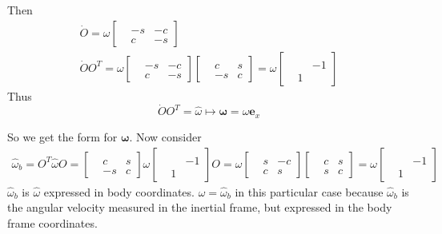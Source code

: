 \documentclass[10pt]{amsart}
\begin{document}
\begin{multicols*}{2}
Then
\[
\begin{gathered}
	\dot{O} = \omega \left[ \begin{matrix} & & \\ & -s & -c \\ & c & -s \end{matrix} \right] \\
	\dot{O}O^T = \omega \left[ \begin{matrix} & & \\ & -s & -c \\ & c & -s \end{matrix} \right] \left[ \begin{matrix} & & \\ & c & s \\ & -s & c \end{matrix} \right] = \omega \left[ \begin{matrix} & & \\ & & -1 \\ & 1 & \end{matrix} \right] 
\end{gathered}
\]
Thus 
\[
\dot{O}O^T = \widehat{\omega} \mapsto \mathbf{\omega} = \omega \mathbf{e}_x
\]

So we get the form for $\mathbf{\omega}$. Now consider
\[
\begin{gathered}
\widehat{\omega}_b = O^T \widehat{\omega} O = \left[ \begin{matrix} & & \\ & c & s \\ & -s & c \end{matrix} \right] \omega \left[ \begin{matrix} & & \\ & & -1 \\ & 1 & \end{matrix} \right] O = \omega \left[ \begin{matrix} & & \\ & s & -c \\ & c & s \end{matrix} \right] \left[ \begin{matrix} & & \\ & c & s \\ & s & c \end{matrix} \right] = \omega \left[ \begin{matrix} & & \\ & & -1 \\ & 1 & \end{matrix} \right]	
\end{gathered}
\]
$\widehat{\omega}_b$ is $\widehat{\omega}$ expressed in body coordinates. $\widehat{\omega} = \widehat{\omega}_b$ in this particular case because $\widehat{\omega}_b$ is the angular velocity measured in the inertial frame, but expressed in the body frame coordinates.


\end{multicols*}
\end{document}

